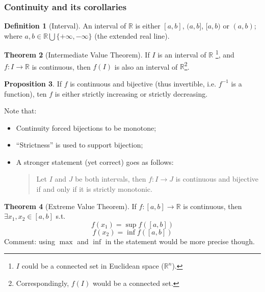 \documentclass[12pt]{article}
\newcommand{\R}{{\mathbb R}}
\theoremstyle{definition}
\newtheorem{theorem}{Theorem}[section]
\newtheorem{definition}[theorem]{Definition}
\newtheorem{proposition}[theorem]{Proposition}
\theoremstyle{plain}
\begin{document}
\subsubsection{Continuity and its corollaries}
\begin{definition}
    [Interval]
    An interval of $\R$ is either $[a,b]$, $(a,b]$, $[a,b)$ or $(a,b)$; where
    $a, b \in \R\bigcup \{ +\infty, -\infty\}$ (the extended real line).
\end{definition}

\begin{theorem}
    [Intermediate Value Theorem]

    If $I$ is an interval of $\R$ \footnote{ $I$ could be a connected set
    in Euclidean space ($\R^n$).}, and $f:I \to \R$ is continuous, then $f(I)$ is also an
    interval of $\R$\footnote{Correspondingly, $f(I)$ would be a connected set.}.
\end{theorem}

\begin{proposition}
    If $f$ is continuous and bijective (thus invertible, i.e. $f^{-1}$ is a
    function), ten $f$ is either strictly increasing or strictly decreasing.

    Note that:
    \begin{itemize}
        \item Continuity forced bijections to be monotone;
        \item ``Strictness'' is used to support bijection;
        \item A stronger statement (yet correct) goes as follows:
        \begin{quote}
            Let $I$ and $J$ be both intervals, then
            $f:I \to J$ is continuous and bijective if and only if it is strictly
            monotonic.
        \end{quote}
    \end{itemize}
\end{proposition}

\begin{theorem}
    [Extreme Value Theorem]
    If $f: [a,b] \to \R$ is continuous, then $\exists x_1, x_2 \in [a,b]$ s.t.
    \[
        f(x_1) = \sup f([a,b])
    \]
    \[
        f(x_2) = \inf f([a,b])
    \]
    Comment: using $\max$ and $\inf$ in the statement would be more precise
    though.
\end{theorem}
\end{document}
